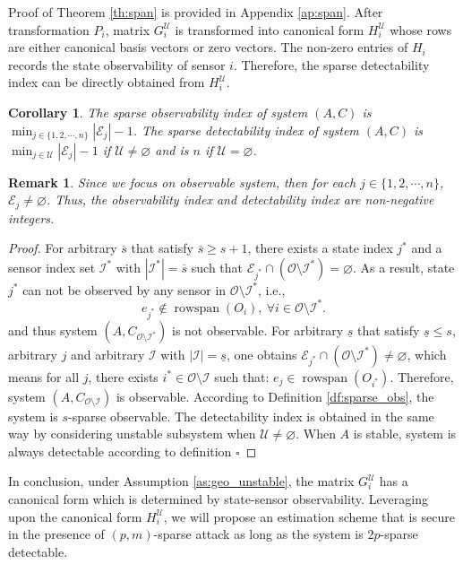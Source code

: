 \documentclass[12pt]{article}  %
\newcommand{\Ec}{{\mathcal{E}}} %
\newcommand{\Ic}{{\mathcal{I}}}
\newcommand{\Uc}{{\mathcal{U}}}
\newcommand{\Oc}{{\mathcal{O}}}
\DeclareMathOperator{\rs}{{rowspan}}
\newtheorem{remark}{\textbf{Remark}}
\newtheorem{corollary}{\textbf{Corollary}}
\newtheorem*{proof}{\textbf{Proof}}
\begin{document}
Proof of Theorem \ref{th:span} is provided in Appendix \ref{ap:span}.
After transformation $P_i$, matrix $G^\Uc_i$ is transformed into canonical form $H^\Uc_{i}$ whose rows are either canonical basis vectors or zero vectors. 
The non-zero entries of $H_i$ records the state observability of sensor $i$. Therefore, the sparse detectability index can be directly obtained from $H^\Uc_i$.
\begin{corollary}\label{co:sparse_obs}
	The sparse observability index of system $(A,C)$ is $\min_{j\in\{1,2,\cdots,n\}} \left|\Ec_{j}\right| - 1 $.
	The sparse detectability index of system $(A,C)$ is $\min_{j\in\Uc} \left|\Ec_{j}\right| - 1 $ if $\Uc\neq\varnothing$ and is $n$ if $\Uc=\varnothing$.
\end{corollary} 
\begin{remark}
	Since we focus on observable system, then for each $j\in\{1,2,\cdots,n\}$, $\Ec_j\neq\varnothing$. Thus, the observability index and detectability index are non-negative integers.
\end{remark}
\begin{proof}
	For arbitrary $\overline{s}$ that satisfy $\overline{s}\geq s+1$, there exists a state index $j^*$ and a sensor index set $\Ic^*$ with $|\Ic^*|=\overline{s}$ such that $\Ec_{j^*} \cap \left(\Oc\setminus\Ic^*\right)=\varnothing$.
	As a result, state $j^*$ can not be observed by any sensor in $\Oc\setminus \Ic^*$, i.e.,
	\begin{equation*}
		e_{j^*}\notin \rs(O_i),\ \forall i\in\Oc\setminus \Ic^*.
	\end{equation*}
	and thus system $(A,C_{\Oc\setminus\Ic^*})$ is not observable.
	For arbitrary $\underline{s}$ that satisfy $\underline{s}\leq s$, arbitrary $j$ and arbitrary $\Ic$ with $|\Ic|=\underline{s}$, one obtains $\Ec_{j^*} \cap \left(\Oc\setminus\Ic^*\right)\neq\varnothing$, which means for all $j$, there exists $i^*\in\Oc\setminus \Ic$ such that: $e_{j}\in \rs(O_{i^*})$. Therefore, system $(A,C_{\Oc\setminus\Ic})$ is observable. According to Definition \ref{df:sparse_obs}, the system is $s$-sparse observable. The detectability index is obtained in the same way by considering unstable subsystem when $\Uc\neq \varnothing$. When $A$ is stable, system is always detectable according to definition $\square$
\end{proof}

In conclusion, under Assumption \ref{as:geo_unstable}, the matrix $G^\Uc_i$ has a canonical form which is determined by state-sensor observability. Leveraging upon the canonical form $H^\Uc_i$, we will propose an estimation scheme that is secure in the presence of $(p,m)$-sparse attack as long as the system is $2p$-sparse detectable.
\end{document}
